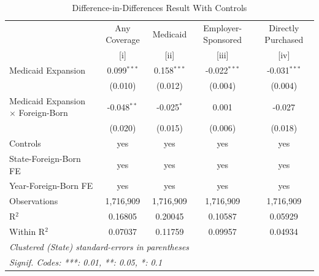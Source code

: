 
\begin{table}[htbp]
   \centering
   \normalsize
   \begin{threeparttable}[b]
      \caption{Difference-in-Differences Result With Controls}
      \renewcommand*{\arraystretch}{1}
      \begin{tabular}{lcccc}
         \tabularnewline \midrule \midrule
                                                   & Any Coverage  & Medicaid      & Employer-Sponsored & Directly Purchased \\   
                                                   & [i]           & [ii]          & [iii]              & [iv]\\  
         \midrule 
         Medicaid Expansion                        & 0.099$^{***}$ & 0.158$^{***}$ & -0.022$^{***}$     & -0.031$^{***}$\\   
                                                   & (0.010)       & (0.012)       & (0.004)            & (0.004)\\   
         Medicaid Expansion $\times$ Foreign-Born  & -0.048$^{**}$ & -0.025$^{*}$  & 0.001              & -0.027\\   
                                                   & (0.020)       & (0.015)       & (0.006)            & (0.018)\\   
         \midrule 
         Controls                                  & yes           & yes           & yes                & yes\\  
         State-Foreign-Born FE                     & yes           & yes           & yes                & yes\\  
         Year-Foreign-Born FE                      & yes           & yes           & yes                & yes\\  
         \midrule 
         Observations                              & 1,716,909     & 1,716,909     & 1,716,909          & 1,716,909\\  
         R$^2$                                     & 0.16805       & 0.20045       & 0.10587            & 0.05929\\  
         Within R$^2$                              & 0.07037       & 0.11759       & 0.09957            & 0.04934\\  
         \midrule \midrule
         \multicolumn{5}{l}{\emph{Clustered (State) standard-errors in parentheses}}\\
         \multicolumn{5}{l}{\emph{Signif. Codes: ***: 0.01, **: 0.05, *: 0.1}}\\
      \end{tabular}
   \end{threeparttable}
\end{table}


